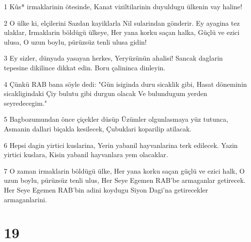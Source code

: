 \par 1 Kûs* irmaklarinin ötesinde, Kanat viziltilarinin duyuldugu ülkenin vay haline!
\par 2 O ülke ki, elçilerini Sazdan kayiklarla Nil sularindan gönderir. Ey ayagina tez ulaklar, Irmaklarin böldügü ülkeye, Her yana korku saçan halka, Güçlü ve ezici ulusa, O uzun boylu, pürüzsüz tenli ulusa gidin!
\par 3 Ey sizler, dünyada yasayan herkes, Yeryüzünün ahalisi! Sancak daglarin tepesine dikilince dikkat edin. Boru çalininca dinleyin.
\par 4 Çünkü RAB bana söyle dedi: "Gün isiginda duru sicaklik gibi, Hasat döneminin sicakligindaki Çiy bulutu gibi durgun olacak Ve bulundugum yerden seyredecegim."
\par 5 Bagbozumundan önce çiçekler düsüp Üzümler olgunlasmaya yüz tutunca, Asmanin dallari biçakla kesilecek, Çubuklari koparilip atilacak.
\par 6 Hepsi dagin yirtici kuslarina, Yerin yabanil hayvanlarina terk edilecek. Yazin yirtici kuslara, Kisin yabanil hayvanlara yem olacaklar.
\par 7 O zaman irmaklarin böldügü ülke, Her yana korku saçan güçlü ve ezici halk, O uzun boylu, pürüzsüz tenli ulus, Her Seye Egemen RAB'be armaganlar getirecek. Her Seye Egemen RAB'bin adini koydugu Siyon Dagi'na getirecekler armaganlarini.

\chapter{19}

